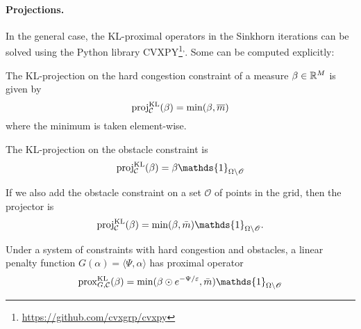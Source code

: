 \documentclass[../report.tex]{subfiles}
\begin{document}
\paragraph{Projections.}
In the general case, the KL-proximal operators in the Sinkhorn iterations can be solved using the Python library CVXPY\footnote{\url{https://github.com/cvxgrp/cvxpy}}\textsuperscript{,}. Some can be computed explicitly:


\begin{prop}\label{prop:KLproxExamples}
	The KL-projection on the hard congestion constraint of a measure $\beta\in\mathbb{R}^M$ is given by
	\begin{equation}
	\operatorname{proj}^{\operatorname{KL}}_{\mathcal{C}}(\beta) = \min(\beta,\overline{m})
	\end{equation}
	where the minimum is taken element-wise.
	
	The KL-projection on the obstacle constraint is
	\begin{equation}
	\proj^{\KL}_\calC (\beta) = \beta \mathds{1}_{\Omega\backslash\mathscr{O}}
	\end{equation}
	
	If we also add the obstacle constraint on a set $\mathscr{O}$ of points in the grid, then the projector is
	\begin{equation}
	\proj^{\KL}_\calC(\beta) = \min(\beta, \bar{m})\mathds{1}_{\Omega\backslash\mathscr{O}}.
	\end{equation}
	
	Under a system of constraints with hard congestion and obstacles, a linear penalty function $G(\alpha) = \langle\Psi, \alpha\rangle$ has proximal operator
	\begin{equation}
	\prox^{\KL}_{G,\calC}(\beta) =
	\min(\beta\odot e^{-\Psi/\epsilon},\bar{m}) \mathds{1}_{\Omega\backslash\mathscr{O}}
	\end{equation}
\end{prop}
\end{document}
